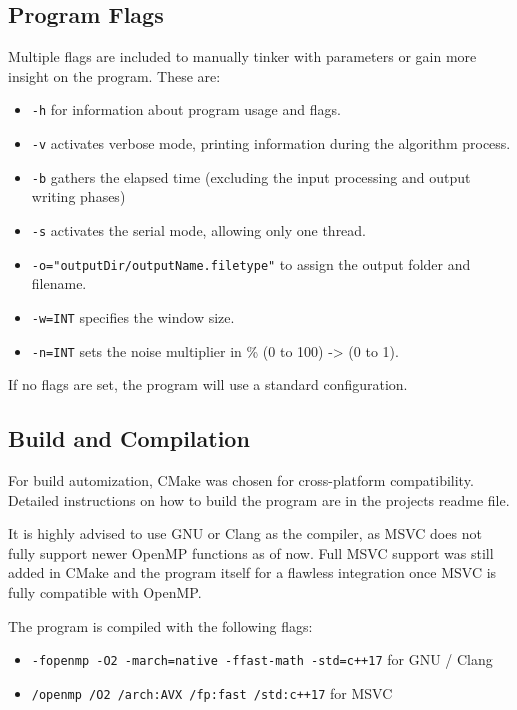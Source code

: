\documentclass[sigconf]{acmart}
\begin{document}
\subsection{Program Flags}

Multiple flags are included to manually tinker with parameters or gain more insight on the program.
These are:

\begin{itemize}
    \item \texttt{-h} for information about program usage and flags.
    \item \texttt{-v} activates verbose mode, printing information during the algorithm process.
    \item \texttt{-b} gathers the elapsed time (excluding the input processing and output writing phases) 
    \item \texttt{-s} activates the serial mode, allowing only one thread.
    \item \texttt{-o="outputDir/outputName.filetype"} to assign the output folder and filename.
    \item \texttt{-w=INT} specifies the window size.
    \item \texttt{-n=INT} sets the noise multiplier in \% (0 to 100) -> (0 to 1).
\end{itemize}

If no flags are set, the program will use a standard configuration. 

\subsection{Build and Compilation}

For build automization, CMake was chosen for cross-platform compatibility. Detailed instructions on how to build the program are in the projects readme file. 

It is highly advised to use GNU or Clang as the compiler, as MSVC does not fully support newer OpenMP functions as of now. Full MSVC support was still added in CMake and the program itself for a flawless integration once MSVC is fully compatible with OpenMP.

The program is compiled with the following flags:
\begin{itemize}
    \item \texttt{-fopenmp -O2 -march=native -ffast-math -std=c++17} for GNU / Clang
    \item \texttt{/openmp /O2 /arch:AVX /fp:fast /std:c++17} for MSVC
\end{itemize}
\end{document}
